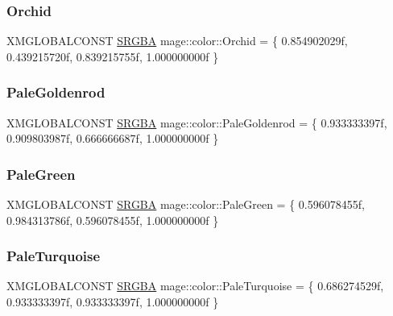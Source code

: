 \hypertarget{namespacemage_1_1color_a5e7b07d4125c3c1fce9b8f0f9b0b9f4d}{}\label{namespacemage_1_1color_a5e7b07d4125c3c1fce9b8f0f9b0b9f4d} 
\subsubsection{\texorpdfstring{Orchid}{Orchid}}
{\footnotesize\ttfamily X\+M\+G\+L\+O\+B\+A\+L\+C\+O\+N\+ST \hyperlink{structmage_1_1_s_r_g_b_a}{S\+R\+G\+BA} mage\+::color\+::\+Orchid = \{ 0.\+854902029f, 0.\+439215720f, 0.\+839215755f, 1.\+000000000f \}}

\hypertarget{namespacemage_1_1color_a6c9f5530f16dfa219b0a881326058c9c}{}\label{namespacemage_1_1color_a6c9f5530f16dfa219b0a881326058c9c} 
\subsubsection{\texorpdfstring{Pale\+Goldenrod}{PaleGoldenrod}}
{\footnotesize\ttfamily X\+M\+G\+L\+O\+B\+A\+L\+C\+O\+N\+ST \hyperlink{structmage_1_1_s_r_g_b_a}{S\+R\+G\+BA} mage\+::color\+::\+Pale\+Goldenrod = \{ 0.\+933333397f, 0.\+909803987f, 0.\+666666687f, 1.\+000000000f \}}

\hypertarget{namespacemage_1_1color_a3d95dc90a4afec7d0092f734396a6c27}{}\label{namespacemage_1_1color_a3d95dc90a4afec7d0092f734396a6c27} 
\subsubsection{\texorpdfstring{Pale\+Green}{PaleGreen}}
{\footnotesize\ttfamily X\+M\+G\+L\+O\+B\+A\+L\+C\+O\+N\+ST \hyperlink{structmage_1_1_s_r_g_b_a}{S\+R\+G\+BA} mage\+::color\+::\+Pale\+Green = \{ 0.\+596078455f, 0.\+984313786f, 0.\+596078455f, 1.\+000000000f \}}

\hypertarget{namespacemage_1_1color_a1aa94704fb56a939398357b938f476c9}{}\label{namespacemage_1_1color_a1aa94704fb56a939398357b938f476c9} 
\subsubsection{\texorpdfstring{Pale\+Turquoise}{PaleTurquoise}}
{\footnotesize\ttfamily X\+M\+G\+L\+O\+B\+A\+L\+C\+O\+N\+ST \hyperlink{structmage_1_1_s_r_g_b_a}{S\+R\+G\+BA} mage\+::color\+::\+Pale\+Turquoise = \{ 0.\+686274529f, 0.\+933333397f, 0.\+933333397f, 1.\+000000000f \}}

